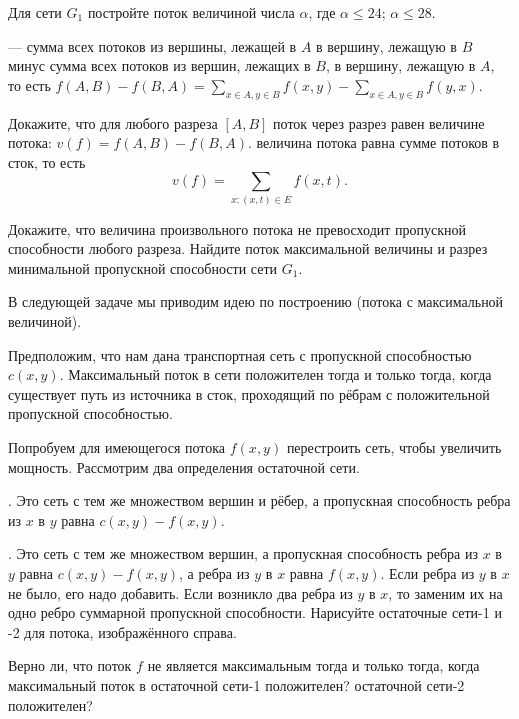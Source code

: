 \documentclass[a4paper,12pt]{article}
\newcommand{\0}[1]{\overline{#1}}
\begin{document}
 Для сети $G_1$ постройте поток величиной числа $\alpha$, где  $\alpha \leq 24$;  $\alpha \leq 28$.




 --- сумма всех потоков из вершины, лежащей в $A$ в вершину, лежащую в $B$ минус сумма всех потоков из вершин, лежащих в $B$, в вершину, лежащую в $A$, то есть $f(A,B)-f(B,A)= \sum_{x \in A, y \in B} f(x,y) -  \sum_{x \in A, y \in B} f(y,x)$.


 Докажите, что 
 для любого разреза $[A,B]$ поток через разрез равен величине потока: $v(f) = f(A,B)-f(B,A)$.
 величина потока равна сумме потоков в сток, то есть $$v(f) = \sum_{x: (x,t) \in E} f(x,t).$$

  Докажите, что величина произвольного потока не превосходит пропускной способности любого разреза.    Найдите поток максимальной величины и разрез минимальной пропускной способности сети $G_1$.

В следующей задаче мы приводим идею по построению   (потока с максимальной величиной).


 Предположим, что нам дана транспортная сеть с пропускной способностью $c(x,y)$.
 Максимальный поток в сети положителен тогда и только тогда, когда существует путь из источника в сток, проходящий по рёбрам с положительной пропускной способностью.

Попробуем  для имеющегося потока $f(x,y)$ перестроить сеть, чтобы увеличить мощность.
Рассмотрим два определения остаточной сети.

. Это сеть с тем же множеством вершин и рёбер, а пропускная способность ребра из $x$ в $y$ равна $c(x,y)-f(x,y)$.

. Это сеть с тем же множеством вершин, а пропускная способность ребра из $x$ в $y$ равна $c(x,y)-f(x,y)$, а ребра из $y$ в $x$ равна $f(x,y)$. Если ребра из $y$ в $x$ не было, его надо добавить. Если возникло два ребра из $y$ в $x$, то заменим их на одно ребро суммарной пропускной способности.
 Нарисуйте остаточные сети-1 и -2 для потока, изображённого справа.



 Верно ли, что поток $f$ не является максимальным тогда и только тогда, когда максимальный поток в остаточной сети-1 положителен? остаточной сети-2 положителен?
\end{document}
